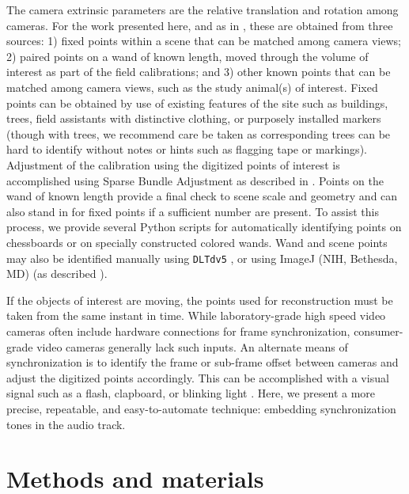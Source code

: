 \documentclass[fleqn,10pt]{wlpeerj}
\begin{document}
The camera extrinsic parameters are the relative translation and rotation among cameras.  For the work presented here, and as in \citep{Theriault:2014}, these are obtained from three sources: 1) fixed points within a scene that can be matched among camera views; 2) paired points on a wand of known length, moved through the volume of interest as part of the field calibrations; and 3) other known points that can be matched among camera views, such as the study animal(s) of interest. Fixed points can be obtained by use of existing features of the site such as buildings, trees, field assistants with distinctive clothing, or purposely installed markers (though with trees, we recommend care be taken as corresponding trees can be hard to identify without notes or hints such as flagging tape or markings).  Adjustment of the calibration using the digitized points of interest is accomplished using Sparse Bundle Adjustment as described in \citep{lour09, Theriault:2014}.  Points on the wand of known length provide a final check to scene scale and geometry and can also stand in for fixed points if a sufficient number are present. To assist this process, we provide several Python scripts for automatically identifying points on chessboards or on specially constructed colored wands. Wand and scene points may also be identified manually using \texttt{DLTdv5} \citep{Hedrick2008}, or using ImageJ (NIH, Bethesda, MD) (as described \citealp{Kane2012}). %

If the objects of interest are moving, the points used for reconstruction must be taken from the same instant in time.  While laboratory-grade high speed video cameras often include hardware connections for frame synchronization, consumer-grade video cameras generally lack such inputs. An alternate means of synchronization is to identify the frame or sub-frame offset between cameras and adjust the digitized points accordingly.  This can be accomplished with a visual signal such as a flash, clapboard, or blinking light \citep{citations}.  Here, we present a more precise, repeatable, and easy-to-automate technique: embedding synchronization tones in the audio track. %









\section*{Methods and materials}
\end{document}
